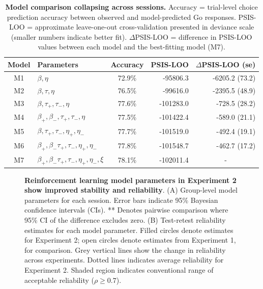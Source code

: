 \documentclass[a4paper,12pt]{article}
\begin{document}
\begin{refsection}[main]
\begin{table}[b!]
    \centering
    \begin{tabular}{clcrr}
        \toprule
        Model & Parameters & Accuracy & \multicolumn{1}{c}{PSIS-LOO} & \multicolumn{1}{c}{$\Delta$PSIS-LOO (se)} \\
        \midrule
        M1 & $\beta, \eta$ & 72.9\% & -95806.3 & -6205.2 (73.2) \\
        M2 & $\beta, \tau, \eta$ & 76.5\% & -99616.0 & -2395.5 (48.9) \\
        M3 & $\beta, \tau_+, \tau_-, \eta$ & 77.6\% & -101283.0 & -728.5 (28.2) \\
        M4 & $\beta_+, \beta_-, \tau_+, \tau_-, \eta$ & 77.5\% & -101422.4 & -589.0 (21.1) \\
        M5 & $\beta, \tau_+, \tau_-, \eta_+, \eta_-$ & 77.7\% & -101519.0 & -492.4 (19.1) \\
        M6 & $\beta_+, \beta_- \tau_+, \tau_-, \eta_+, \eta_-$ & 77.8\% & -101548.7 & -462.7 (17.2) \\
        M7 & $\beta_+, \beta_- \tau_+, \tau_-, \eta_+, \eta_-, \xi$ & 78.1\% & -102011.4 & \multicolumn{1}{c}{-} \\
        \bottomrule
\end{tabular}
    \caption{{\bf Model comparison collapsing across sessions.} Accuracy = trial-level choice prediction accuracy between observed and model-predicted Go responses. PSIS-LOO = approximate leave-one-out cross-validation presented in deviance scale (smaller numbers indicate better fit). \break $\Delta$PSIS-LOO = difference in PSIS-LOO values between each model and the best-fitting model (M7).}
    \label{tab:exp2_mc_abbr}
\end{table}

\begin{figure}[hb!]
    \centerline{}
    \caption{{\bf Reinforcement learning model parameters in Experiment 2 show improved stability and reliability}. (A) Group-level model parameters for each session. Error bars indicate 95\% Bayesian confidence intervals (CIs). ** Denotes pairwise comparison where 95\% CI of the difference excludes zero. (B) Test-retest reliability estimates for each model parameter. Filled circles denote estimates for Experiment 2; open circles denote estimates from Experiment 1, for comparison. Grey vertical lines show the change in reliability across experiments. Dotted lines indicates average reliability for Experiment 2. Shaded region indicates conventional range of acceptable reliability ($\rho \geq 0.7$).}
    \label{fig:exp02_modeling}
\end{figure}


\end{refsection}
\end{document}
